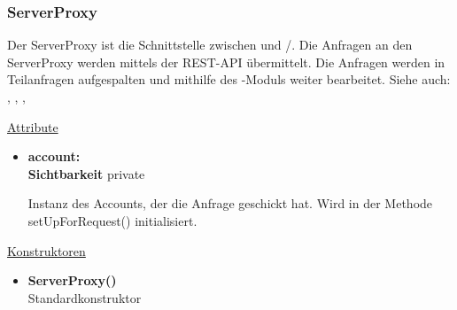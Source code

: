 \subsubsection{ServerProxy} \label{service:klasse:ServerProxy}
Der ServerProxy ist die Schnittstelle zwischen  und /. Die Anfragen an den ServerProxy werden mittels der REST-API übermittelt. Die Anfragen werden in Teilanfragen aufgespalten und mithilfe des -Moduls weiter bearbeitet. \newline
Siehe auch: , , , 

\underline{Attribute}
\begin{itemize}
\itemsep0pt
\item \textbf{account: } \hfill\\ 
\textbf{Sichtbarkeit} private

Instanz des Accounts, der die Anfrage geschickt hat. Wird in der Methode setUpForRequest() initialisiert.
\end{itemize}

\underline{Konstruktoren}
\begin{itemize}
\itemsep0pt
\item \textbf{ServerProxy()} \hfill\\
Standardkonstruktor
\end{itemize}

